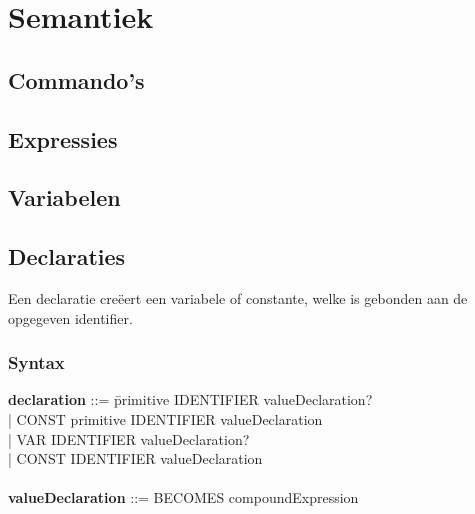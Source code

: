 \chapter{Semantiek}

\section{Commando's}

\section{Expressies}

\section{Variabelen}


\section{Declaraties}
Een declaratie cre\"{e}ert een variabele of constante, welke is gebonden aan de opgegeven identifier.
    \subsection{Syntax}    
        \begin{tabbing}
        {\bf declaration}                 ::= \=primitive IDENTIFIER valueDeclaration?\\
                                              \>| CONST primitive IDENTIFIER valueDeclaration\\
                                              \>| VAR IDENTIFIER valueDeclaration?\\
                                              \>| CONST IDENTIFIER valueDeclaration\\
        \\
        {\bf valueDeclaration}            ::= BECOMES compoundExpression\\
        \end{tabbing}
